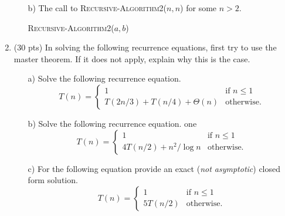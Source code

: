 \documentclass{article}
\begin{document}
\begin{enumerate}
\begin{itemize}
\begin{algorithm}[H]
{}
\end{algorithm}


\vspace{.3in}

\item[b)] The call to \textsc{Recursive-Algorithm2}($n,n$) for some $n>2$.
\vspace{10pt}

\begin{algorithm}[H]
\textsc{Recursive-Algorithm2}($a, b$)\;
\end{algorithm}
\end{itemize}

\newpage
\item (30 pts) In solving the following recurrence equations, first try to use the master theorem. If it does not apply, explain why this is the case.

\begin{itemize}
\item [a)] Solve the following recurrence equation.
\begin{equation*}
T(n) = 
\begin{cases}
1 &\text{if $n\leq 1$}\\
T(2n/3)+T(n/4)+\Theta(n) &\text{otherwise.}
\end{cases}
\end{equation*}
\item [b)] Solve the following recurrence equation.
one
\begin{equation*}
T(n) = 
\begin{cases}
1 &\text{if $n\leq 1$}\\
4T(n/2)+n^2/\log n &\text{otherwise.}
\end{cases}
\end{equation*}

\item [c)] For the following equation provide an exact (\emph{not asymptotic}) closed form solution.
\begin{equation*}
T(n) = 
\begin{cases}
1 &\text{if $n\leq 1$}\\
5T(n/2) &\text{otherwise.}
\end{cases}
\end{equation*}
\end{itemize}



\end{enumerate}
\end{document}
